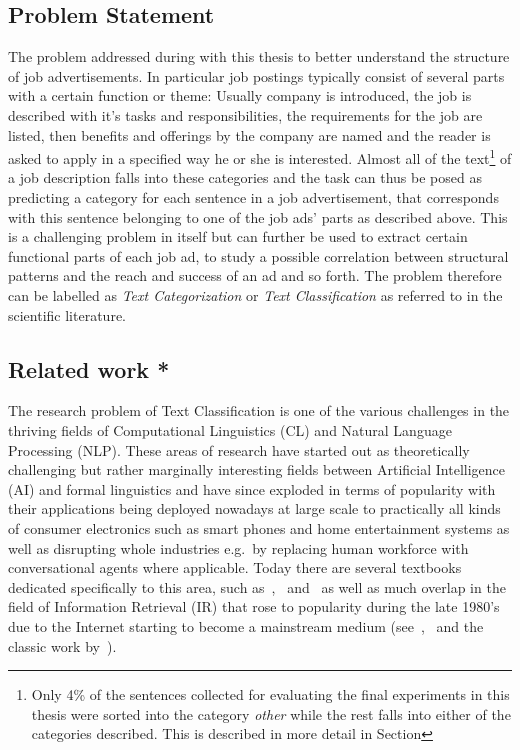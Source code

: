 \subsection{Problem Statement}

The problem addressed during with this thesis to better understand the structure of job advertisements. In particular job postings typically consist of several parts with a certain function or theme: Usually company is introduced, the job is described with it's tasks and responsibilities, the requirements for the job are listed, then benefits and offerings by the company are named and the reader is asked to apply in a specified way he or she is interested.
Almost all of the text\footnote{Only 4\% of the sentences collected for evaluating the final experiments in this thesis were sorted into the category \emph{other} while the rest falls into either of the categories described. This is described in more detail in Section } of a job description falls into these categories and the task can thus be posed as predicting a category for each sentence in a job advertisement, that corresponds with this sentence belonging to one of the job ads' parts as described above.
This is a challenging problem in itself but can further be used to extract certain functional parts of each job ad, to study a possible correlation between structural patterns and the reach and success of an ad and so forth. The problem therefore can be labelled as \emph{Text Categorization} or \emph{Text Classification} as referred to in the scientific literature.

\subsection{Related work *}

The research problem of Text Classification is one of the various challenges in the thriving fields of Computational Linguistics (CL) and Natural Language Processing (NLP). These areas of research have started out as theoretically challenging but rather marginally interesting fields between Artificial Intelligence (AI) and formal linguistics and have since exploded in terms of popularity with their applications being deployed nowadays at large scale to practically all kinds of consumer electronics such as smart phones and home entertainment systems as well as disrupting whole industries e.g.\ by replacing human workforce with conversational agents where applicable.
Today there are several textbooks dedicated specifically to this area, such as~\cite{Manning:1999aa},~\cite{Jurafsky:2014aa} and~\cite{Clark:2013aa} as well as much overlap in the field of Information Retrieval (IR) that rose to popularity during the late 1980's due to the Internet starting to become a mainstream medium (see~\cite{Manning:2008aa},~\cite{Leskovec:2014aa} and the classic work by~\cite{Rijsbergen:1979aa}).

